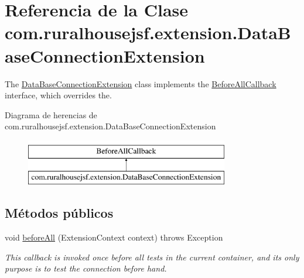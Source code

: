 \hypertarget{classcom_1_1ruralhousejsf_1_1extension_1_1_data_base_connection_extension}{}\section{Referencia de la Clase com.\+ruralhousejsf.\+extension.\+Data\+Base\+Connection\+Extension}
\label{classcom_1_1ruralhousejsf_1_1extension_1_1_data_base_connection_extension}


The \mbox{\hyperlink{classcom_1_1ruralhousejsf_1_1extension_1_1_data_base_connection_extension}{Data\+Base\+Connection\+Extension}} class implements the \mbox{\hyperlink{}{Before\+All\+Callback}} interface, which overrides the.  


Diagrama de herencias de com.\+ruralhousejsf.\+extension.\+Data\+Base\+Connection\+Extension\begin{figure}[H]
\begin{center}
\leavevmode
\includegraphics[height=2.000000cm]{dc/deb/classcom_1_1ruralhousejsf_1_1extension_1_1_data_base_connection_extension}
\end{center}
\end{figure}
\subsection*{Métodos públicos}
\begin{DoxyCompactItemize}
\item 
void \mbox{\hyperlink{classcom_1_1ruralhousejsf_1_1extension_1_1_data_base_connection_extension_ae1fe703d5f0bdd5f29f0f4b9f0645e3e}{before\+All}} (Extension\+Context context)  throws Exception 
\begin{DoxyCompactList}\small\item\em This callback is invoked once {\ttfamily before} all tests in the current container, and its only purpose is to test the connection before hand. \end{DoxyCompactList}\end{DoxyCompactItemize}
